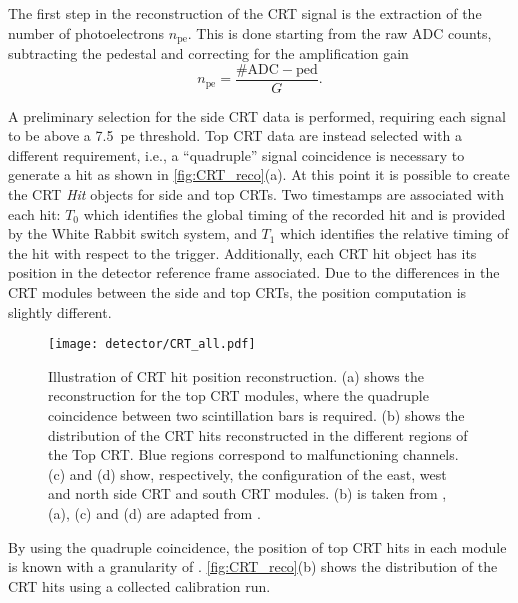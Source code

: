 The first step in the reconstruction of the CRT signal is the extraction of the number of photoelectrons $n_\mathrm{pe}$. This is done starting from the raw ADC counts, subtracting the pedestal and correcting for the amplification gain \begin{equation}
    n_\mathrm{pe} = \frac{\mathrm{\#ADC} - \mathrm{ped}}{G}. 
\end{equation} 

A preliminary selection for the side CRT data is performed, requiring each signal to be above a \SI{7.5}{pe} threshold. Top CRT data are instead selected with a different requirement, i.e., a ``quadruple'' signal coincidence is necessary to generate a hit as shown in \autoref{fig:CRT_reco}(a). At this point it is possible to create the CRT \emph{Hit} objects for side and top CRTs. Two timestamps are associated with each hit: $T_0$ which identifies the global timing of the recorded hit and is provided by the White Rabbit switch system, and $T_1$ which identifies the relative timing of the hit with respect to the trigger. Additionally, each CRT hit object has its position in the detector reference frame associated. Due to the differences in the CRT modules between the side and top CRTs, the position computation is slightly different. 

\begin{figure}
    \centering
    \texttt{[image: detector/CRT\_all.pdf]}
    \caption[CRT Hit reconstruction in space]{Illustration of CRT hit position reconstruction. (a) shows the reconstruction for the top CRT modules, where the quadruple coincidence between two scintillation bars is required. (b) shows the distribution of the CRT hits reconstructed in the different regions of the Top CRT. Blue regions correspond to malfunctioning channels. (c) and (d) show, respectively, the configuration of the east, west and north side CRT and south CRT modules. (b) is taken from \cite{Poppi:2023zmp}, (a), (c) and (d) are adapted from \cite{arteroponsStudyReconstructionNuMuCC}.}
    \label{fig:CRT_reco}
\end{figure}

By using the quadruple coincidence, the position of top CRT hits in each module is known with a granularity of . \autoref{fig:CRT_reco}(b) shows the distribution of the CRT hits using a collected calibration run. 

